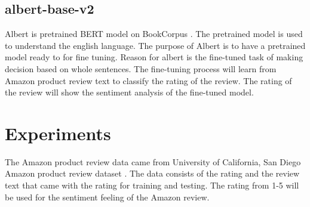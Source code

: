 \documentclass[11pt,a4paper]{article}
\begin{document}
\subsection{albert-base-v2}

Albert is pretrained BERT model on BookCorpus \cite{DBLP:journals/corr/abs-1909-11942}. The pretrained model is used to understand the english language. The purpose of Albert is to have a pretrained model ready to for fine tuning. Reason for albert is the fine-tuned task of making decision based on whole sentences. The fine-tuning process will learn from Amazon product review text to classify the rating of the review. The rating of the review will show the sentiment analysis of the fine-tuned model.







\section{Experiments}

The Amazon product review data came from University of California, San Diego Amazon product review dataset \cite{data}. The data consists of the rating and the review text that came with the rating for training and testing. The rating from 1-5 will be used for the sentiment feeling of the Amazon review.
\end{document}
